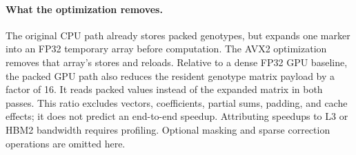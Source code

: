 \documentclass{article}
\begin{document}
\paragraph{What the optimization removes.}
The original CPU path already stores packed genotypes, but expands
one marker into an FP32 temporary array before computation.
The AVX2 optimization removes that array's stores and reloads.
Relative to a dense FP32 GPU baseline, the packed GPU path also
reduces the resident genotype matrix payload by a factor of 16.
It reads packed values instead of the expanded matrix in both passes.
This ratio excludes vectors, coefficients, partial sums, padding, and
cache effects; it does not predict an end-to-end speedup.
Attributing speedups to L3 or HBM2 bandwidth requires profiling.
Optional masking and sparse correction operations are omitted here.
\end{document}
